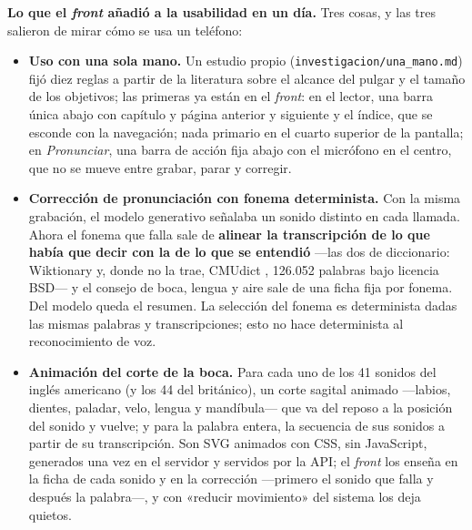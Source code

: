 \documentclass[11pt,a4paper]{article}
\newcommand{\cod}[1]{\texttt{\small #1}}
\begin{document}
\medskip\noindent\textbf{Lo que el \emph{front} añadió a la usabilidad en un día.} Tres
cosas, y las tres salieron de mirar cómo se usa un teléfono:

\begin{itemize}
  \item \textbf{Uso con una sola mano.} Un estudio propio
        (\cod{investigacion/\allowbreak una\_mano.md}) fijó diez reglas a partir de la
        literatura sobre el alcance del pulgar y el tamaño de los objetivos; las primeras ya
        están en el \emph{front}: en el lector, una barra única abajo con capítulo y página
        anterior y siguiente y el índice, que se esconde con la navegación; nada primario
        en el cuarto superior de la pantalla; en \emph{Pronunciar}, una barra de acción
        fija abajo con el micrófono en el centro, que no se mueve entre grabar, parar y
        corregir.
  \item \textbf{Corrección de pronunciación con fonema determinista.} Con la misma
        grabación, el modelo generativo señalaba un sonido distinto en cada llamada. Ahora
        el fonema que falla sale de \textbf{alinear la transcripción de lo que había que
        decir con la de lo que se entendió} ---las dos de diccionario: Wiktionary y, donde
        no la trae, CMUdict \parencite{cmudict}, 126.052 palabras bajo licencia BSD--- y el consejo de boca,
        lengua y aire sale de una ficha fija por fonema. Del modelo queda el resumen.
        La selección del fonema es determinista dadas las mismas palabras y
        transcripciones; esto no hace determinista al reconocimiento de voz.
  \item \textbf{Animación del corte de la boca.} Para cada uno de los 41 sonidos del
        inglés americano (y los 44 del británico), un corte sagital animado ---labios,
        dientes, paladar, velo, lengua y mandíbula--- que va del reposo a la posición del
        sonido y vuelve; y para la palabra entera, la secuencia de sus sonidos a partir de
        su transcripción. Son SVG animados con CSS, sin JavaScript, generados una vez en el
        servidor y servidos por la API; el \emph{front} los enseña en la ficha de cada
        sonido y en la corrección ---primero el sonido que falla y después la palabra---, y
        con «reducir movimiento» del sistema los deja quietos.
\end{itemize}
\end{document}
